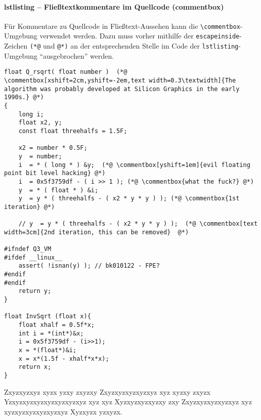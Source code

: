 \paragraph{lstlisting -- Fließtextkommentare im Quellcode (commentbox)}
Für Kommentare zu Quellcode in Fließtext-Aussehen kann die \verb|\commentbox|-Umgebung verwendet werden. Dazu muss vorher mithilfe der \verb|escapeinside|-Zeichen \verb|(*@| und \verb|@*)| an der entsprechenden Stelle im Code der \verb|lstlisting|-Umgebung \enquote{ausgebrochen} werden.

\lstset{language=C}
\begin{lstlisting}[caption={Fast inverse square root is a \code{method} of calculating the reciprocal (or multiplicative inverse) of a square root for a 32-bit floating point number in IEEE 754 floating point format. The algorithm was probably developed at Silicon Graphics in the early 1990s, and an implementation appeared in 1999 in the Quake III Arena source code, but the method did not appear on public forums such as Usenet until 2002 or 2003. At the time, the primary advantage of the algorithm came from avoiding computationally expensive floating point operations in favor of integer operations. Inverse square roots are used to compute angles of incidence and reflection for lighting and shading in computer graphics.}, label=code:two]
float Q_rsqrt( float number )  (*@ \commentbox[xshift=2cm,yshift=-2em,text width=0.3\textwidth]{The algorithm was probably developed at Silicon Graphics in the early 1990s.} @*)
{
	long i;
	float x2, y;
	const float threehalfs = 1.5F;
	
	x2 = number * 0.5F;
	y  = number;
	i  = * ( long * ) &y;  (*@ \commentbox[yshift=1em]{evil floating point bit level hacking} @*) 
	i  = 0x5f3759df - ( i >> 1 ); (*@ \commentbox{what the fuck?} @*)
	y  = * ( float * ) &i;
	y  = y * ( threehalfs - ( x2 * y * y ) ); (*@ \commentbox{1st iteration} @*)
	
	// y  = y * ( threehalfs - ( x2 * y * y ) );  (*@ \commentbox[text width=3cm]{2nd iteration, this can be removed}  @*)
	
#ifndef Q3_VM
#ifdef __linux__
	assert( !isnan(y) ); // bk010122 - FPE?
#endif
#endif
	return y;
}
	
float InvSqrt (float x){
	float xhalf = 0.5f*x;
	int i = *(int*)&x;
	i = 0x5f3759df - (i>>1);
	x = *(float*)&i;
	x = x*(1.5f - xhalf*x*x);
	return x;
}
\end{lstlisting}

Zxyzxyzxyz xyzx yzxy zxyzxy Zxyzxyzxyzxyzxyz xyz xyzxy zxyzx Yzxyzxyzxyzxyzxyzxyzxyz xyz xyz Xyzxyzxyzxyzxy zxy Zxyzxyzxyzxyzxyz xyz xyzxyzxyzxyzxyzxyz Xyzxyzx yzxyzx.

